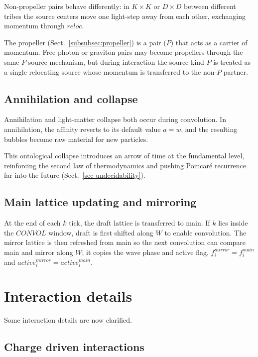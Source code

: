 \documentclass{ijuc}
\begin{document}
Non-propeller pairs behave differently: in $K \times K$ or $D \times D$ between different tribes the source centers move one light-step away from each other, exchanging momentum through $\boldsymbol{\mathit{reloc}}$.

The propeller (Sect.~\ref{subsubsec:propeller}) is a pair ($P$) that acts as a carrier of momentum. Free photon or graviton pairs may become propellers through the same $P$ source mechanism, but during interaction the source kind $P$ is treated as a single relocating source whose momentum is transferred to the non-$P$ partner.

\subsection{Annihilation and collapse}

Annihilation and light-matter collapse both occur during convolution. In annihilation, the affinity reverts to its default value $a=w$, and the resulting bubbles become raw material for new particles.

This ontological collapse introduces an arrow of time at the fundamental level, reinforcing the second law of thermodynamics and pushing Poincaré recurrence far into the future (Sect.~\ref{sec-undecidability}).

\subsection{Main lattice updating and mirroring} \label{subsec:updating}
At the end of each $k$ tick, the draft lattice is transferred to main. If $k$ lies inside the $CONVOL$ window, draft is first shifted along $W$ to enable convolution. The mirror lattice is then refreshed from main so the next convolution can compare main and mirror along $W$; it copies the wave phase and active flag, $f_i^{mirror}=f_i^{main}$ and $\mathit{active}_i^{mirror}=\mathit{active}_i^{main}$.


\section{Interaction details\label{sec:Interactions}}

Some interaction details are now clarified.

\subsection{Charge driven interactions}
\end{document}
